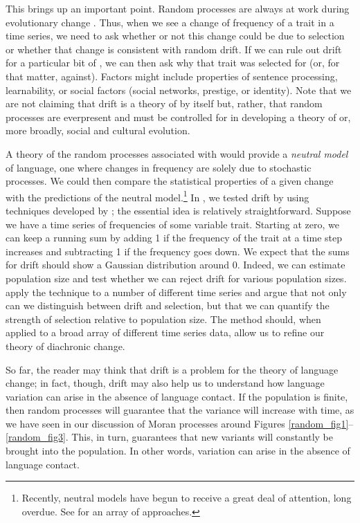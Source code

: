 \documentclass[output=paper]{langsci/langscibook}
\begin{document}

This brings up an important point.  Random processes are always at
work during evolutionary change \citep{kimura:1983}.  Thus, when we
see a change of frequency of a trait in a time series, we need to ask
whether or not this change could be due to selection or whether that
change is consistent with random drift.  If we can rule out drift for
a particular bit of , we can then ask why that trait
was selected for (or, for that matter, against).  Factors might
include properties of sentence processing, learnability, or social
factors (social networks, prestige, or identity).  Note that we are
not claiming that drift is a theory of  by itself but,
rather, that random processes are everpresent and must be controlled
for in developing a theory of  or, more broadly, social
and cultural evolution.

A theory of the random processes associated with  would
provide a \emph{neutral model} of language, one where changes in
frequency are solely due to stochastic processes.  We could then
compare the statistical properties of a given change with the
predictions of the neutral model.\footnote{Recently, neutral models
  have begun to receive a great deal of attention, long overdue.  See
  \citet{baxter-etal:2006, baxter-etal:2009, blythe:2012,
    blythe-croft:2012, kauhanen:2017, stadler-etal:2016} for an array
  of approaches.} In \citet{newberry-etal:2017}, we tested
drift by using techniques developed by \citet{feder_etal:2014}; the
essential idea is relatively straightforward.  Suppose we have a time
series of frequencies of some variable trait. Starting at zero, we can
keep a running sum by adding 1 if the frequency of the trait at a time
step increases and subtracting 1 if the frequency goes down.  We
expect that the sums for drift should show a Gaussian distribution
around 0.  Indeed, we can estimate population size and test whether we
can reject drift for various population
sizes. \citet{newberry-etal:2017} apply the technique to a
number of different time series and argue that not only can we
distinguish between drift and selection, but that we can quantify the
strength of selection relative to population size.  The method should,
when applied to a broad array of different time series data, allow us
to refine our theory of diachronic change.

So far, the reader may think that drift is a problem for the theory of language
change; in fact, though, drift may also help us to understand how language
variation can arise in the absence of language contact.  If the population is
finite, then random processes will guarantee that the variance will increase
with time, as we have seen in our discussion of Moran processes around Figures
\ref{random_fig1}--\ref{random_fig3}.  This, in turn, guarantees that new
variants will constantly be brought into the population.  In other words,
variation can arise in the absence of language contact.
\end{document}
